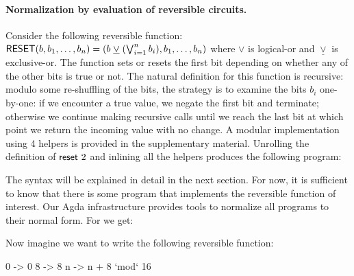 \paragraph*{Normalization by evaluation of reversible circuits.} Consider the following reversible function:
$\Afun{RESET}(b,b_1,\ldots,b_n) = (b \; \underline{\vee} \; (\bigvee_{i=1}^n b_i),b_1,\ldots,b_n)$ where $\vee$ is
logical-or and $\underline{\vee}$ is exclusive-or. The function sets or resets the first bit depending on whether any of
the other bits is true or not. The natural definition for this function is recursive: modulo some re-shuffling of the
bits, the strategy is to examine the bits $b_i$ one-by-one: if we encounter a true value, we negate the first bit and
terminate; otherwise we continue making recursive calls until we reach the last bit at which point we return the
incoming value with no change. A modular implementation using 4 helpers is provided in the supplementary
material. Unrolling the definition of $\Afun{reset}~2$ and inlining all the helpers produces the following program:


  \resettwo{}

The syntax will be explained in detail in the next section. For now, it is sufficient to know that there is some program
that implements the reversible function of interest. Our Agda infrastructure provides tools to normalize all programs to
their normal form. For  we get:

  \resetnormtwo{}




Now imagine we want to write the following reversible function:

0 -> 0
8 -> 8
n -> n + 8 `mod` 16


